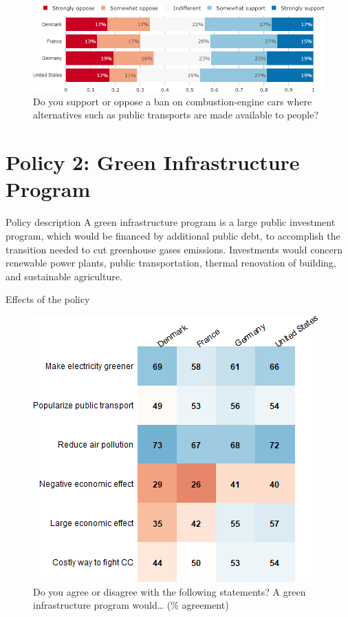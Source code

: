 \documentclass[aspectratio=169,9pt,dvipsnames]{beamer}
\begin{document}
\begin{frame}{}%
\begin{figure}[h!]
\centering
\caption{Do you support or oppose a ban on combustion-engine cars where alternatives such as public transports are made available to people?}
\includegraphics[width=\textwidth]{../figures/country_comparison/standard_public_transport_support_countries.png}
\end{figure}
\end{frame}

\section{Policy 2: Green Infrastructure Program}


\begin{frame}{Policy description}%
A green infrastructure program is a large public investment program, which would be financed by additional public debt, to accomplish the transition needed to cut greenhouse gases emissions. Investments would concern renewable power plants, public transportation, thermal renovation of building, and sustainable agriculture.
\end{frame}


\begin{frame}{Effects of the policy}%


\begin{figure}[h!]
\centering
\caption{Do you agree or disagree with the following statements? A green infrastructure program would… (\% agreement)}
\includegraphics[width=.45\textwidth]{../figures/country_comparison/investments_effect_positive_countries.png}
\end{figure}
\end{frame}
\end{document}
